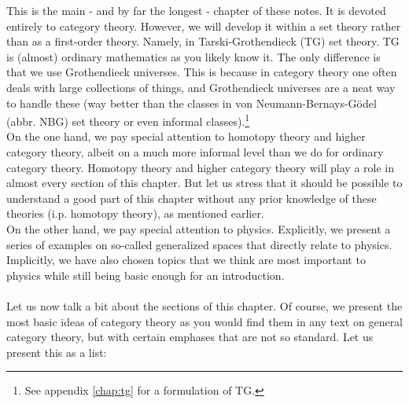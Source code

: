 This is the main - and by far the longest - chapter of these notes.
It is devoted entirely to category theory.
However, we will develop it within a set theory rather than as a first-order theory.
Namely, in Tarski-Grothendieck (TG) set theory.
TG is (almost) ordinary mathematics as you likely know it.
The only difference is that we use {\glqq}Grothendieck universes{\grqq}.
This is because in category theory one often deals with large collections of things, and Grothendieck universes are a neat way to handle these (way better than the classes in von Neumann-Bernays-G\"{o}del (abbr. NBG) set theory or even informal classes).\footnote{See appendix \ref{chap:tg} for a formulation of TG.}
\\
On the one hand, we pay special attention to homotopy theory and higher category theory, albeit on a much more informal level than we do for ordinary category theory.
Homotopy theory and higher category theory will play a role in almost every section of this chapter.
But let us stress that it should be possible to understand a good part of this chapter without any prior knowledge of these theories (i.p. homotopy theory), as mentioned earlier.
\\
On the other hand, we pay special attention to physics.
Explicitly, we present a series of examples on so-called generalized spaces that directly relate to physics.
Implicitly, we have also chosen topics that we think are most important to physics while still being basic enough for an introduction.
\\\\
Let us now talk a bit about the sections of this chapter.
Of course, we present the most basic ideas of category theory as you would find them in any text on general category theory, but with certain emphases that are not so standard.
Let us present this as a list:
